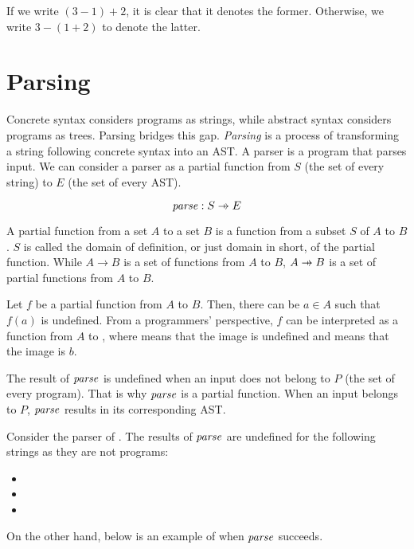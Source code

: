 If we write $(3-1)+2$, it is clear that it denotes the former. Otherwise, we
write $3-(1+2)$ to denote the latter.

\section{Parsing}

Concrete syntax considers programs as strings, while abstract syntax considers
programs as trees. Parsing bridges this gap. \textit{Parsing} is
a process of transforming a string following concrete syntax into an AST. A
parser is a program that parses input. We can consider a parser as a partial
function from $S$ (the set of every string) to $E$ (the set of
every AST).

\[\embox{parse}: S\pto E\]

\begin{kaobox}[frametitle=Partial functions]
  A partial function from a set $A$ to a set $B$ is a function from a subset $S$ of
  $A$ to $B$. $S$ is called the domain of definition, or just domain in short, of the partial function.
  While $A\rightarrow B$ is a set of functions from $A$ to $B$, $A\pto B$ is a set
  of partial functions from $A$ to $B$.

  Let $f$ be a partial function from $A$ to $B$. Then, there can be $a\in A$ such
  that $f(a)$ is undefined. From a programmers' perspective, $f$ can be
  interpreted as a function from $A$ to , where 
  means that the image is undefined and  means that the image is
  $b$.
\end{kaobox}

The result of $\mbox{\emph{parse}}$
is undefined when an input does not belong to $P$ (the set of every
program). That is why $\mbox{\emph{parse}}$ is a partial function. When an input
belongs to $P$, $\mbox{\emph{parse}}$ results in its corresponding AST.

Consider the parser of \lang. The results of $\mbox{\emph{parse}}$ are undefined for
the following strings as they are not \lang programs:

\begin{itemize}
  \item {}
  \item {}
  \item {}
\end{itemize}

On the other hand, below is an example of when $\mbox{\emph{parse}}$ succeeds.

